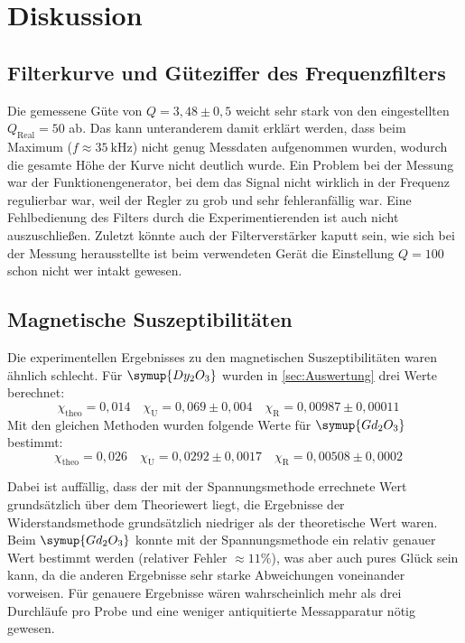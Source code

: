 \section{Diskussion}
\label{sec:Diskussion}

\subsection{Filterkurve und Güteziffer des Frequenzfilters}
\label{sec:Filterkurve und Güteziffer des Frequenzfilters}

Die gemessene Güte von $Q = 3,48 \pm 0,5$ weicht sehr stark von den eingestellten 
$Q_\text{Real} = 50$ ab. Das kann unteranderem damit erklärt werden, dass beim Maximum ($f
\approx \SI{35}{\kilo\hertz}$) nicht genug Messdaten aufgenommen wurden, wodurch die
gesamte Höhe der Kurve nicht deutlich wurde. Ein Problem bei der Messung war der
Funktionengenerator, bei dem das Signal nicht wirklich in der Frequenz regulierbar war,
weil der Regler zu grob und sehr fehleranfällig war. Eine Fehlbedienung des Filters durch die
Experimentierenden ist auch nicht auszuschließen. Zuletzt könnte auch der Filterverstärker
kaputt sein, wie sich bei der Messung herausstellte ist beim verwendeten Gerät die Einstellung 
$Q = 100$ schon nicht wer intakt gewesen.

\subsection{Magnetische Suszeptibilitäten}
\label{sec:Magnetische Suszeptibilitäten}

Die experimentellen Ergebnisses zu den magnetischen Suszeptibilitäten waren ähnlich
schlecht. Für $\symup{Dy_2O_3}$ wurden in \autoref{sec:Auswertung} drei Werte berechnet:
\begin{equation}
	\label{eqn:ergebnisse-Dy2O3}
	\chi_\text{theo} = 0,014
	\quad
	\chi_\text{U} = 0,069 \pm 0,004
	\quad
	\chi_\text{R} = 0,00987 \pm 0,00011
	\quad
\end{equation}
Mit den gleichen Methoden wurden folgende Werte für $\symup{Gd_2O_3}$ bestimmt:
\begin{equation}
	\label{eqn:ergebnisse-Gd2O3}
	\chi_\text{theo} = 0,026
	\quad
	\chi_\text{U} = 0,0292 \pm 0,0017
	\quad
	\chi_\text{R} = 0,00508 \pm 0,0002
	\quad
\end{equation}

Dabei ist auffällig, dass der mit der Spannungsmethode errechnete Wert grundsätzlich 
über dem Theoriewert liegt, die Ergebnisse der Widerstandsmethode grundsätzlich niedriger
als der theoretische Wert waren. Beim $\symup{Gd_2O_3}$ konnte mit der Spannungsmethode
ein relativ genauer Wert bestimmt werden (relativer Fehler $\approx 11\%$),
was aber auch pures Glück sein kann, da die anderen Ergebnisse sehr starke
Abweichungen voneinander vorweisen. Für genauere Ergebnisse wären
wahrscheinlich mehr als drei Durchläufe pro Probe und eine weniger antiquitierte Messapparatur 
nötig gewesen.

